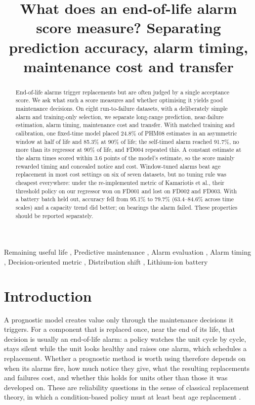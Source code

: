 \documentclass[a4paper,fleqn,doubleblind]{cas-dc}
\begin{document}
\let\WriteBookmarks\relax
\let\printorcid\relax
\def\floatpagepagefraction{1}
\def\textpagefraction{.001}
\title [mode = title]{What does an end-of-life alarm score measure? Separating prediction accuracy, alarm timing, maintenance cost and transfer}
\begin{abstract}
End-of-life alarms trigger replacements but are often judged by a single acceptance score. We ask what such a score measures and whether optimising it yields good maintenance decisions. On eight run-to-failure datasets, with a deliberately simple alarm and training-only selection, we separate long-range prediction, near-failure estimation, alarm timing, maintenance cost and transfer. With matched training and calibration, one fixed-time model placed 24.8\% of PHM08 estimates in an asymmetric window at half of life and 85.3\% at 90\% of life; the self-timed alarm reached 91.7\%, no more than its regressor at 90\% of life, and FD004 repeated this. A constant estimate at the alarm times scored within 3.6 points of the model's estimate, so the score mainly rewarded timing and concealed notice and cost. Window-tuned alarms beat age replacement in most cost settings on six of seven datasets, but no tuning rule was cheapest everywhere: under the re-implemented metric of Kamariotis et al., their threshold policy on our regressor won on FD001 and lost on FD002 and FD003. With a battery batch held out, accuracy fell from 95.1\% to 79.7\% (63.4--84.6\% across time scales) and a capacity trend did better; on bearings the alarm failed. These properties should be reported separately.
\end{abstract}
\begin{keywords}
Remaining useful life \sep
Predictive maintenance \sep
Alarm evaluation \sep
Alarm timing \sep
Decision-oriented metric \sep
Distribution shift \sep
Lithium-ion battery
\end{keywords}
\maketitle
\linenumbers
\section{Introduction}\label{sec:1}

A prognostic model creates value only through the maintenance decisions it triggers. For a component that is replaced once, near the end of its life, that decision is usually an end-of-life alarm: a policy watches the unit cycle by cycle, stays silent while the unit looks healthy and raises one alarm, which schedules a replacement. Whether a prognostic method is worth using therefore depends on when its alarms fire, how much notice they give, what the resulting replacements and failures cost, and whether this holds for units other than those it was developed on. These are reliability questions in the sense of classical replacement theory, in which a condition-based policy must at least beat age replacement \cite{barlow1960,dejonge2020}.
\end{document}
